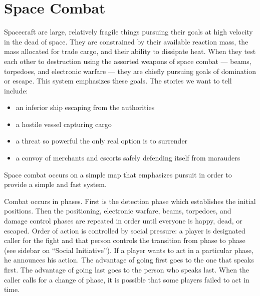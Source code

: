 \chapter{Space Combat}
\label{cha:space-combat}



Spacecraft are large, relatively fragile things pursuing their goals at high velocity in the dead of space. They are constrained by their available reaction mass, the mass  allocated for trade cargo, and their ability to dissipate heat. When they test each other to destruction using the assorted weapons of space combat --- beams, torpedoes, and electronic warfare --- they are chiefly pursuing goals of domination or escape. This system emphasizes these goals. The stories we want to tell include:

\begin{itemize}
\item an inferior ship escaping from the authorities
\item a hostile vessel capturing cargo
\item a threat so powerful the only real option is to surrender
\item a convoy of merchants and escorts safely defending itself from marauders
\end{itemize}

Space combat occurs on a simple map that emphasizes pursuit in order to provide a simple and fast system.

Combat occurs in phases. First is the detection phase which establishes the initial positions. Then the positioning, electronic warfare, beams, torpedoes, and damage control phases are repeated in order until everyone is happy, dead, or escaped. Order of action is controlled by social pressure: a player is designated caller for the fight and that person controls the transition from phase to phase (see sidebar on ``Social Initiative''). If a player wants to act in a particular phase, he announces his action. The advantage of going first goes to the one that speaks first. The advantage of going last goes to the person who speaks last. When the caller calls for a change of phase, it is possible that some players failed to act in time.









